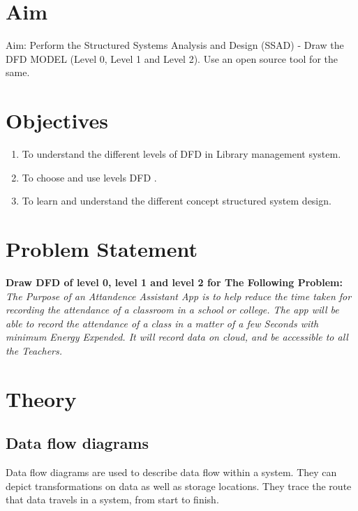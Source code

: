 \documentclass[11pt]{article}
\begin{document}
\tableofcontents
\thispagestyle{empty}
\clearpage

\setcounter{page}{1}

\section{Aim}
Aim: Perform the Structured Systems Analysis and Design (SSAD) - Draw the DFD MODEL
(Level 0, Level 1 and Level 2). Use an open source tool for the same.


\section{Objectives}

\begin{enumerate}
	\item To understand the different levels of DFD in Library management system.
	\item To choose and use levels DFD .
	\item To learn and understand the different concept structured system design.
\end{enumerate}

\section{Problem Statement}

\textbf{Draw DFD of level 0, level 1 and level 2 for The Following Problem:} \\

\textit{The Purpose of an Attandence Assistant App is to help reduce the time taken for recording the attendance of a classroom in a school or college. The app will be able to record the attendance of a class in a matter of a few Seconds with minimum Energy Expended. It will record data on cloud, and be accessible to all the Teachers.}\\

\section{Theory}

\subsection{Data flow diagrams}
Data flow diagrams are used to describe data flow within a system. They can depict transformations on
data as well as storage locations. They trace the route that data travels in a system, from start to finish.
\end{document}
